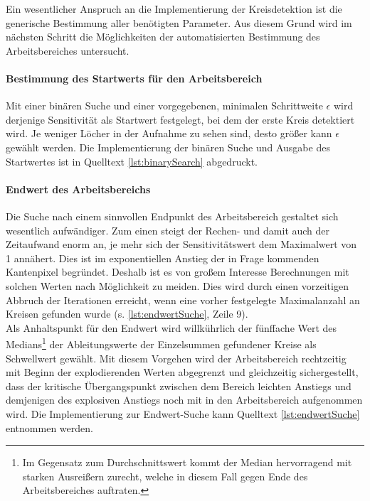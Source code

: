 \documentclass[accentcolor=tud1c, 11pt, toc=bib, toc=listof, captions=abovetable, parskip=half]{tudreport}
\begin{document}
Ein wesentlicher Anspruch an die Implementierung der Kreisdetektion ist die generische Bestimmung aller benötigten Parameter. Aus diesem Grund wird im nächsten Schritt die Möglichkeiten der automatisierten Bestimmung des Arbeitsbereiches untersucht.

\paragraph{Bestimmung des Startwerts für den Arbeitsbereich}
Mit einer binären Suche und einer vorgegebenen, minimalen Schrittweite $\epsilon$ wird derjenige Sensitivität als Startwert festgelegt, bei dem der erste Kreis detektiert wird. Je weniger Löcher in der Aufnahme zu sehen sind, desto größer kann $\epsilon$ gewählt werden. Die Implementierung der binären Suche und Ausgabe des Startwertes ist in Quelltext \ref{lst:binarySearch} abgedruckt.\\


\paragraph{Endwert des Arbeitsbereichs}
Die Suche nach einem sinnvollen Endpunkt des Arbeitsbereich gestaltet sich wesentlich aufwändiger. Zum einen steigt der Rechen- und damit auch der Zeitaufwand enorm an, je mehr sich der Sensitivitätswert dem Maximalwert von 1 annähert. Dies ist im exponentiellen Anstieg der in Frage kommenden Kantenpixel begründet. Deshalb ist es von großem Interesse Berechnungen mit solchen Werten nach Möglichkeit zu meiden. Dies wird durch einen vorzeitigen Abbruch der Iterationen erreicht, wenn eine vorher festgelegte Maximalanzahl an Kreisen gefunden wurde (s. \ref{lst:endwertSuche}, Zeile 9). \\
Als Anhaltspunkt für den Endwert wird willkührlich der fünffache Wert des Medians\footnote{Im Gegensatz zum Durchschnittswert kommt der Median hervorragend mit starken Ausreißern zurecht, welche in diesem Fall gegen Ende des Arbeitsbereiches auftraten.} der Ableitungswerte der Einzelsummen gefundener Kreise als Schwellwert gewählt. Mit diesem Vorgehen wird der Arbeitsbereich rechtzeitig mit Beginn der explodierenden Werten abgegrenzt und gleichzeitig sichergestellt, dass der kritische Übergangspunkt zwischen dem Bereich leichten Anstiegs und demjenigen des explosiven Anstiegs noch mit in den Arbeitsbereich aufgenommen wird. Die Implementierung zur Endwert-Suche kann Quelltext \ref{lst:endwertSuche} entnommen werden.\\
\end{document}
